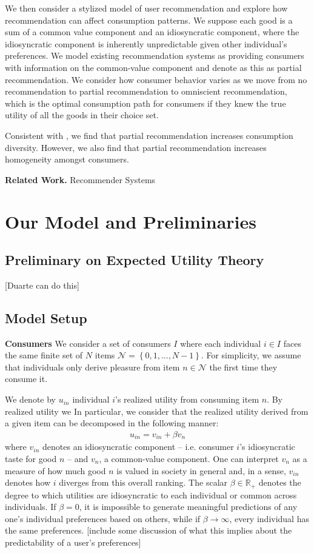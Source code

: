 \documentclass[sigconf]{acmart}
\begin{document}
We then consider a stylized model of user recommendation and explore how recommendation can affect consumption patterns. We suppose each good is a sum of a common value component and an idiosyncratic component, where the idiosyncratic component is inherently unpredictable given other individual's preferences. We model existing recommendation systems as providing consumers with information on the common-value component and denote as this as partial recommendation. We consider how consumer behavior varies as we move from no recommendation to partial recommendation to omniscient recommendation, which is the optimal consumption path for consumers if they knew the true utility of all the goods in their choice set.

Consistent with \cite{nguyen2014exploring}, we find that partial recommendation increases consumption diversity. However, we also find that partial recommendation increases homogeneity amongst consumers. 

\textbf{Related Work.}
Recommender Systems

\section{Our Model and Preliminaries}

\subsection{Preliminary on Expected Utility Theory}
[Duarte can do this]

\subsection{Model Setup}
\par
\noindent \textbf{Consumers} We consider a set of consumers $I$ where each individual $i \in I$ faces the same finite set of $N$ items $\mathcal{N} = \left\{0,1,...,N-1\right\}$. For simplicity, we assume that individuals only derive pleasure from item $n \in \mathcal{N}$ the first time they consume it.

We denote by $u_{in}$ individual $i$'s realized utility from consuming item $n$. By realized utility we In particular, we consider that the realized utility derived from a given item can be decomposed in the following manner:
\begin{align*}
u_{in}= v_{in} + \beta v_n
\end{align*}
where $v_{in}$ denotes an idiosyncratic component -- i.e. consumer $i$'s idiosyncratic taste for good $n$ --  and $v_{n}$, a common-value component. One can interpret $v_n$ as a measure of how much good $n$ is valued in society in general and, in a sense, $v_{in}$ denotes how $i$ diverges from this overall ranking. The scalar $\beta \in \mathbb{R}_{+}$ denotes the degree to which utilities are idiosyncratic to each individual or common across individuals. If $\beta=0$, it is impossible to generate meaningful predictions of any one's individual preferences based on others, while if $\beta \rightarrow \infty$, every individual has the same preferences. [include some discussion of what this implies about the predictability of a user's preferences]
\end{document}
